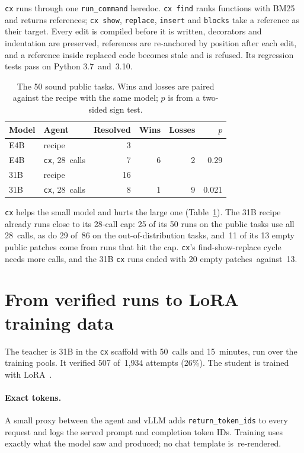 \texttt{cx} runs through one \texttt{run\_command} heredoc. \texttt{cx find} ranks functions with BM25 \citep{bm25} and returns references; \texttt{cx show}, \texttt{replace}, \texttt{insert} and \texttt{blocks} take a reference as their target. Every edit is compiled before it is written, decorators and indentation are preserved, references are re-anchored by position after each edit, and a reference inside replaced code becomes stale and is refused. Its regression tests pass on Python 3.7~and~3.10.

\begin{table}[t]
\centering
\caption{The 50 sound public tasks. Wins and losses are paired against the recipe with the same model; $p$ is from a two-sided sign test.}\label{tab:cx}
\small
\begin{tabular}{llrrrr}
\toprule
Model & Agent & Resolved & Wins & Losses & $p$ \\
\midrule
E4B & recipe & 3 &  &  &  \\
E4B & \texttt{cx}, 28~calls & 7 & 6 & 2 & 0.29 \\
31B & recipe & 16 &  &  &  \\
31B & \texttt{cx}, 28~calls & 8 & 1 & 9 & 0.021 \\
\bottomrule
\end{tabular}
\end{table}

\texttt{cx} helps the small model and hurts the large one (Table~\ref{tab:cx}). The 31B recipe already runs close to its 28-call cap: 25 of its 50 runs on the public tasks use all 28~calls, as do 29 of~86 on the out-of-distribution tasks, and~11 of its 13 empty public patches come from runs that hit the cap. \texttt{cx}'s find-show-replace cycle needs more calls, and the 31B \texttt{cx} runs ended with 20 empty patches~against~13.


\section{From verified runs to LoRA training data}\label{sec:pipeline}

The teacher is 31B in the \texttt{cx} scaffold with 50~calls and 15~minutes, run over the training pools. It verified 507 of~1,934 attempts (26\%). The student is trained with LoRA~\citep{lora}.

\paragraph{Exact tokens.} A small proxy between the agent and vLLM adds \texttt{return\_token\_ids} to every request and logs the served prompt and completion token IDs. Training uses exactly what the model saw and produced; no chat template is~re-rendered.

